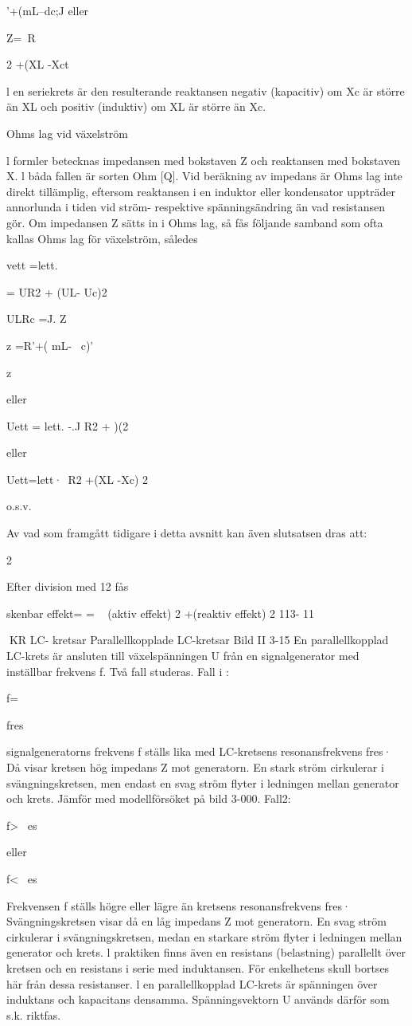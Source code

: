 {'+(mL--dc;J eller

Z=~R

2
+(XL -Xct

l en seriekrets är den resulterande
reaktansen negativ (kapacitiv) om Xc är
större än XL och positiv (induktiv) om XL är
större än Xc.

Ohms lag vid växelström

l formler betecknas impedansen med bokstaven Z och reaktansen med bokstaven X.
l båda fallen är sorten Ohm [Q].
Vid beräkning av impedans är Ohms lag
inte direkt tillämplig, eftersom reaktansen i
en induktor eller kondensator uppträder annorlunda i tiden vid ström- respektive spänningsändring än vad resistansen gör.
Om impedansen Z sätts in i Ohms lag, så
fås följande samband som ofta kallas Ohms
lag för växelström, således

vett =lett.

= UR2 + (UL- Uc)2

ULRc =J. Z

z =R'+( mL- ~c)'

z

eller

Uett = lett. -.J R2 + )(2

eller

Uett=lett·~R2 +(XL -Xc) 2

o.s.v.

Av vad som framgått tidigare i detta avsnitt
kan även slutsatsen dras att:

2

Efter division med 12 fås

skenbar effekt=
= ~ (aktiv effekt) 2 +(reaktiv effekt) 2
113- 11

KR
LC- kretsar
Parallellkopplade LC-kretsar
Bild II 3-15
En parallellkopplad LC-krets är ansluten till
växelspänningen U från en signalgenerator
med inställbar frekvens f. Två fall studeras.
Fall i :

f=

fres

signalgeneratorns frekvens f ställs lika
med LC-kretsens resonansfrekvens fres· Då
visar kretsen hög impedans Z mot generatorn. En stark ström cirkulerar i svängningskretsen, men endast en svag ström flyter i
ledningen mellan generator och krets.
Jämför med modellförsöket på bild 3-000.
Fall2:

f> ~es

eller

f< ~es

Frekvensen f ställs högre eller lägre än
kretsens resonansfrekvens fres·
Svängningskretsen visar då en låg impedans Z mot generatorn. En svag ström cirkulerar i svängningskretsen, medan en starkare ström flyter i ledningen mellan generator och krets.
l praktiken finns även en resistans (belastning) parallellt över kretsen och en resistans i serie med induktansen. För enkelhetens skull bortses här från dessa resistanser.
l en parallellkopplad LC-krets är spänningen över induktans och kapacitans densamma. Spänningsvektorn U används därför som s.k. riktfas.

}

